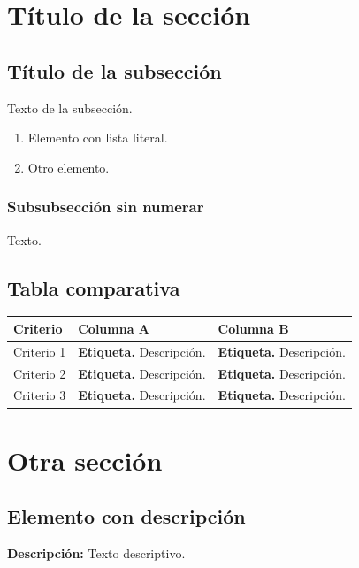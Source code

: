 \documentclass[11pt,a4paper]{article}
\begin{document}
\section{Título de la sección}

\subsection{Título de la subsección}
Texto de la subsección.

\begin{enumerate}[label=\alph*)]
    \item Elemento con lista literal.
    \item Otro elemento.
\end{enumerate}

\subsubsection*{Subsubsección sin numerar}
Texto.

\newpage
\subsection{Tabla comparativa}
\begin{table}[H]
\centering
\begin{tabular}{@{}p{3.5cm}p{5cm}p{5cm}@{}}
\toprule
\textbf{Criterio} & \textbf{Columna A} & \textbf{Columna B} \\ \midrule
Criterio 1 & \textbf{Etiqueta.} Descripción. & \textbf{Etiqueta.} Descripción. \\
Criterio 2 & \textbf{Etiqueta.} Descripción. & \textbf{Etiqueta.} Descripción. \\
Criterio 3 & \textbf{Etiqueta.} Descripción. & \textbf{Etiqueta.} Descripción. \\ \bottomrule
\end{tabular}
\end{table}

\section{Otra sección}

\subsection{Elemento con descripción}
\textbf{Descripción:} Texto descriptivo.
\end{document}
